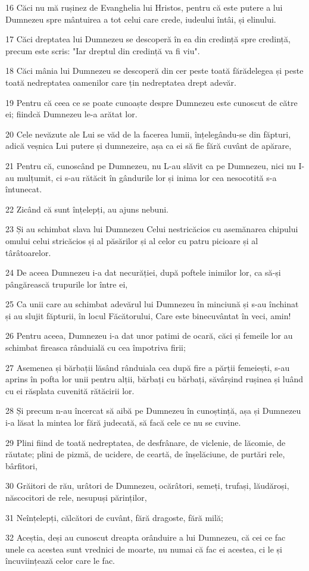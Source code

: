 \par 16 Căci nu mă rușinez de Evanghelia lui Hristos, pentru că este putere a lui Dumnezeu spre mântuirea a tot celui care crede, iudeului întâi, și elinului.
\par 17 Căci dreptatea lui Dumnezeu se descoperă în ea din credință spre credință, precum este scris: "Iar dreptul din credință va fi viu".
\par 18 Căci mânia lui Dumnezeu se descoperă din cer peste toată fărădelegea și peste toată nedreptatea oamenilor care țin nedreptatea drept adevăr.
\par 19 Pentru că ceea ce se poate cunoaște despre Dumnezeu este cunoscut de către ei; fiindcă Dumnezeu le-a arătat lor.
\par 20 Cele nevăzute ale Lui se văd de la facerea lumii, înțelegându-se din făpturi, adică veșnica Lui putere și dumnezeire, așa ca ei să fie fără cuvânt de apărare,
\par 21 Pentru că, cunoscând pe Dumnezeu, nu L-au slăvit ca pe Dumnezeu, nici nu I-au mulțumit, ci s-au rătăcit în gândurile lor și inima lor cea nesocotită s-a întunecat.
\par 22 Zicând că sunt înțelepți, au ajuns nebuni.
\par 23 Și au schimbat slava lui Dumnezeu Celui nestricăcios cu asemănarea chipului omului celui stricăcios și al păsărilor și al celor cu patru picioare și al târâtoarelor.
\par 24 De aceea Dumnezeu i-a dat necurăției, după poftele inimilor lor, ca să-și pângărească trupurile lor între ei,
\par 25 Ca unii care au schimbat adevărul lui Dumnezeu în minciună și s-au închinat și au slujit făpturii, în locul Făcătorului, Care este binecuvântat în veci, amin!
\par 26 Pentru aceea, Dumnezeu i-a dat unor patimi de ocară, căci și femeile lor au schimbat fireasca rânduială cu cea împotriva firii;
\par 27 Asemenea și bărbații lăsând rânduiala cea după fire a părții femeiești, s-au aprins în pofta lor unii pentru alții, bărbați cu bărbați, săvârșind rușinea și luând cu ei răsplata cuvenită rătăcirii lor.
\par 28 Și precum n-au încercat să aibă pe Dumnezeu în cunoștință, așa și Dumnezeu i-a lăsat la mintea lor fără judecată, să facă cele ce nu se cuvine.
\par 29 Plini fiind de toată nedreptatea, de desfrânare, de viclenie, de lăcomie, de răutate; plini de pizmă, de ucidere, de ceartă, de înșelăciune, de purtări rele, bârfitori,
\par 30 Grăitori de rău, urâtori de Dumnezeu, ocărâtori, semeți, trufași, lăudăroși, născocitori de rele, nesupuși părinților,
\par 31 Neînțelepți, călcători de cuvânt, fără dragoste, fără milă;
\par 32 Aceștia, deși au cunoscut dreapta orânduire a lui Dumnezeu, că cei ce fac unele ca acestea sunt vrednici de moarte, nu numai că fac ei acestea, ci le și încuviințează celor care le fac.

